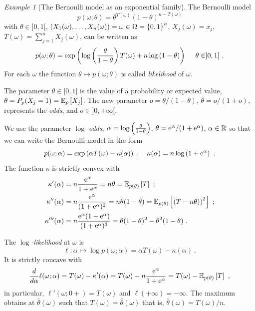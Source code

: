 \documentclass[12pt,a4paper]{amsart}
\theoremstyle{plain}%
\theoremstyle{definition}
\theoremstyle{remark}
\newtheorem{example}{Example}
\begin{document}
\begin{example}[The Bernoulli model as an exponential family]
  The Bernoulli model
  \begin{equation*}
 p(\omega;\theta) = \theta^{T(\omega)} (1-\theta)^{n-T(\omega)}
\end{equation*}
with $\theta \in ]0,1[$, $(X_1(\omega),\dots,X_n(\omega)) = \omega \in \Omega = \left\{0,1\right\}^n$, $X_j(\omega) = x_j$, $T(\omega) = \sum_{j=1}^n X_j(\omega)$, can be written as
    \begin{equation*}
      p(\omega;\theta) = \expof{\logof{\frac{\theta}{1-\theta}}T(\omega) + n\logof{1-\theta}} \ \quad \theta \in ]0,1[ \ .
    \end{equation*}
    For each $\omega$ the function $\theta \mapsto p(\omega;\theta)$ is called \emph{likelihood} of $\omega$.

    The parameter $\theta \in ]0,1[$ is the value of a probability or expected value, $\theta = P_p(X_j=1) = \operatorname{\mathbb E}_{p}\left[X_j\right]$. The new parameter $o = \theta/(1-\theta)$, $\theta = o/(1+o)$, represents the \emph{odds}, and $o \in ]0,+\infty[$.

    We use the parameter \emph{$\log$-odds}, $\alpha = \log\left(\frac{\theta}{1-\theta}\right)$, $\theta = \mathrm{e}^\alpha/(1+\mathrm{e}^\alpha)$, $\alpha \in \mathbb{R}$ so that we can write the Bernoulli model in the form
  \begin{equation*}
    p(\omega;\alpha) = \expof{\alpha T(\omega) - \kappa(\alpha)} \ , \quad \kappa(\alpha) = n \logof{1+\euler^\alpha} \ .
  \end{equation*}
The function $\kappa$ is strictly convex with
\begin{align*}
  \kappa'(\alpha) &= n\frac{\euler^\alpha}{1+\euler^\alpha} = n\theta = \expectat {p(\theta)} T \ ;\\
  \kappa''(\alpha) &= n\frac{\euler^\alpha}{(1+\euler^\alpha)^2} = n\theta(1-\theta) = \expectat {p(\theta)} {\left(T-n\theta)\right)^2} \ ; \\
  \kappa'''(\alpha) &= n \frac{\euler^\alpha(1-\euler^\alpha)}{(1+\euler^\alpha)^3} = \theta(1-\theta)^2 - \theta^2(1-\theta) \ .
\end{align*}

The \emph{$\log$-likelihood} at $\omega$ is
\begin{equation*}
 \ell \colon \alpha \mapsto \log p(\omega;\alpha) = \alpha T(\omega) - \kappa(\alpha) \ .
\end{equation*}
It is strictly concave with
\begin{equation*}
  \frac{d}{d\alpha} \ell(\omega;\alpha) = T(\omega) - \kappa'(\alpha) = T(\omega) -  n \frac{\mathrm{e}^\alpha}{1+\mathrm{e}^\alpha} = T(\omega) - \operatorname{\mathbb E}_{p(\theta)}\left[T\right] \ ,
\end{equation*}
in particular, $\ell'(\omega;0+) = T(\omega)$ and $\ell(+\infty) = -\infty$. The maximum obtains at $\hat\theta(\omega)$ such that $T(\omega) = \hat\theta(\omega)$ that is, $\hat \theta(\omega) = T(\omega)/n$.


\end{example}
\end{document}
